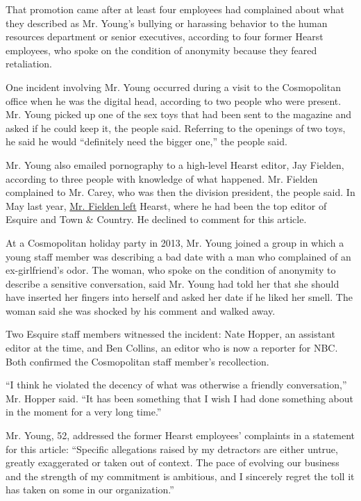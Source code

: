 That promotion came after at least four employees had complained about
what they described as Mr. Young's bullying or harassing behavior to the
human resources department or senior executives, according to four
former Hearst employees, who spoke on the condition of anonymity because
they feared retaliation.

One incident involving Mr. Young occurred during a visit to the
Cosmopolitan office when he was the digital head, according to two
people who were present. Mr. Young picked up one of the sex toys that
had been sent to the magazine and asked if he could keep it, the people
said. Referring to the openings of two toys, he said he would
``definitely need the bigger one,'' the people said.

Mr. Young also emailed pornography to a high-level Hearst editor, Jay
Fielden, according to three people with knowledge of what happened. Mr.
Fielden complained to Mr. Carey, who was then the division president,
the people said. In May last year,
\href{https://www.nytimes.com/2019/05/23/business/media/esquires-editor-fielden-hearst-magazines.html}{Mr.
Fielden left} Hearst, where he had been the top editor of Esquire and
Town \& Country. He declined to comment for this article.

At a Cosmopolitan holiday party in 2013, Mr. Young joined a group in
which a young staff member was describing a bad date with a man who
complained of an ex-girlfriend's odor. The woman, who spoke on the
condition of anonymity to describe a sensitive conversation, said Mr.
Young had told her that she should have inserted her fingers into
herself and asked her date if he liked her smell. The woman said she was
shocked by his comment and walked away.

Two Esquire staff members witnessed the incident: Nate Hopper, an
assistant editor at the time, and Ben Collins, an editor who is now a
reporter for NBC. Both confirmed the Cosmopolitan staff member's
recollection.

``I think he violated the decency of what was otherwise a friendly
conversation,'' Mr. Hopper said. ``It has been something that I wish I
had done something about in the moment for a very long time.''

Mr. Young, 52, addressed the former Hearst employees' complaints in a
statement for this article: ``Specific allegations raised by my
detractors are either untrue, greatly exaggerated or taken out of
context. The pace of evolving our business and the strength of my
commitment is ambitious, and I sincerely regret the toll it has taken on
some in our organization.''

